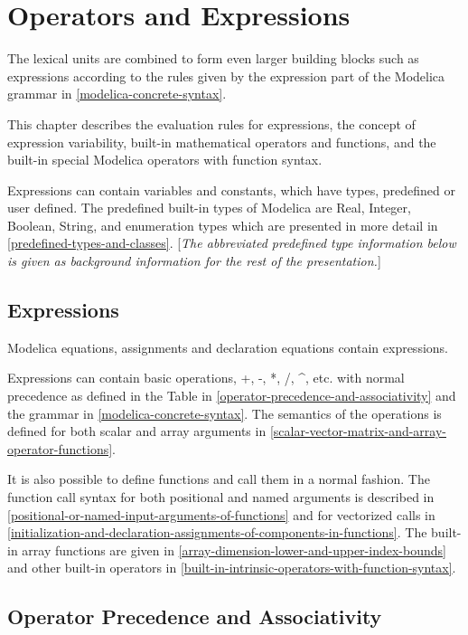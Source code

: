 \chapter{Operators and Expressions}

The lexical units are combined to form even larger building blocks such
as expressions according to the rules given by the expression part of
the Modelica grammar in \autoref{modelica-concrete-syntax}.

This chapter describes the evaluation rules for expressions, the concept
of expression variability, built-in mathematical operators and
functions, and the built-in special Modelica operators with function
syntax.

Expressions can contain variables and constants, which have types,
predefined or user defined. The predefined built-in types of Modelica
are Real, Integer, Boolean, String, and enumeration types which are
presented in more detail in \autoref{predefined-types-and-classes}. {[}\emph{The abbreviated
predefined type information below is given as background information for
the rest of the presentation.}{]}

\section{Expressions}

Modelica equations, assignments and declaration equations contain
expressions.

Expressions can contain basic operations, +, -, *, /, \^{}, etc. with
normal precedence as defined in the Table in \autoref{operator-precedence-and-associativity} and the grammar
in \autoref{modelica-concrete-syntax}. The semantics of the operations is defined for both
scalar and array arguments in \autoref{scalar-vector-matrix-and-array-operator-functions}.

It is also possible to define functions and call them in a normal
fashion. The function call syntax for both positional and named
arguments is described in \autoref{positional-or-named-input-arguments-of-functions} and for vectorized calls in
\autoref{initialization-and-declaration-assignments-of-components-in-functions}. The built-in array functions are given in \autoref{array-dimension-lower-and-upper-index-bounds}
and other built-in operators in \autoref{built-in-intrinsic-operators-with-function-syntax}.

\section{Operator Precedence and Associativity}


